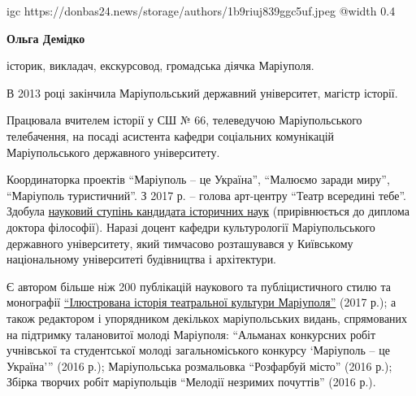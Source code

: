  
 
 
 
 

\clearpage

\begingroup
\small

\ifcmt
  igc https://donbas24.news/storage/authors/1b9riuj839ggc5uf.jpeg
  @width 0.4
\fi

\textbf{Ольга Демідко}


історик, викладач, екскурсовод, громадська діячка Маріуполя.

В 2013 році закінчила Маріупольський державний університет, магістр історії.

Працювала вчителем історії у СШ № 66, телеведучою Маріупольського телебачення,
на посаді асистента кафедри соціальних комунікацій Маріупольського державного
університету.

Координаторка проектів \enquote{Маріуполь – це Україна}, \enquote{Малюємо
заради миру}, \enquote{Маріуполь туристичний}. З 2017 р. – голова арт-центру
\enquote{Театр всередині тебе}.  Здобула
\href{https://archive.org/details/book.2019.olga_demidko.dissertacia}{науковий
ступінь кандидата історичних наук} (прирівнюється до диплома доктора
філософії). Наразі доцент кафедри культурології Маріупольського державного
університету, який тимчасово розташувався у Київському національному
університеті будівництва і архітектури.

Є автором більше ніж 200 публікацій наукового та публіцистичного стилю та монографії
\href{https://archive.org/details/book.2017.olga_demidko.iljustrovana_istoria_teatralnoi_kultury_mariupolja}{%
\enquote{Ілюстрована історія театральної культури Маріуполя}} (2017 р.); а також
редактором і упорядником декількох маріупольських видань, спрямованих на
підтримку талановитої молоді Маріуполя: \enquote{Альманах конкурсних робіт учнівської
та студентської молоді загальноміського конкурсу \enquote{Маріуполь – це Україна}} (2016
р.); Маріупольська розмальовка \enquote{Розфарбуй місто} (2016 р.); Збірка творчих
робіт маріупольців \enquote{Мелодії незримих почуттів} (2016 р.). 

